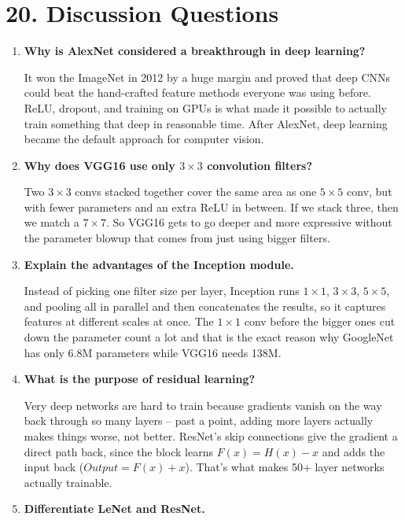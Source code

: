 \documentclass[11pt]{article}
\begin{document}

\section*{20. Discussion Questions}

\begin{enumerate}

\item \textbf{Why is AlexNet considered a breakthrough in deep learning?}

It won the ImageNet in 2012 by a huge margin and proved that deep CNNs
could beat the hand-crafted feature methods everyone was using before.
ReLU, dropout, and training on GPUs is what made it possible to actually
train something that deep in reasonable time. After AlexNet, deep learning
became the default approach for computer vision.

\item \textbf{Why does VGG16 use only $3\times3$ convolution filters?}

Two $3\times3$ convs stacked together cover the same area as one $5\times5$
conv, but with fewer parameters and an extra ReLU in between. If we stack three,
then we match a $7\times7$. So VGG16 gets to go deeper and more expressive
without the parameter blowup that comes from just using bigger filters.

\item \textbf{Explain the advantages of the Inception module.}

Instead of picking one filter size per layer, Inception runs $1\times1$,
$3\times3$, $5\times5$, and pooling all in parallel and then concatenates the
results, so it captures features at different scales at once. The
$1\times1$ conv before the bigger ones cut down the parameter count a lot and that is the exact reason why GoogleNet has only 6.8M parameters while
VGG16 needs 138M.

\item \textbf{What is the purpose of residual learning?}

Very deep networks are hard to train because gradients vanish on the way
back through so many layers -- past a point, adding more layers actually
makes things worse, not better. ResNet's skip connections give the gradient
a direct path back, since the block learns $F(x)=H(x)-x$ and adds the input
back ($Output=F(x)+x$). That's what makes 50+ layer networks actually
trainable.

\item \textbf{Differentiate LeNet and ResNet.}


\end{enumerate}
\end{document}
